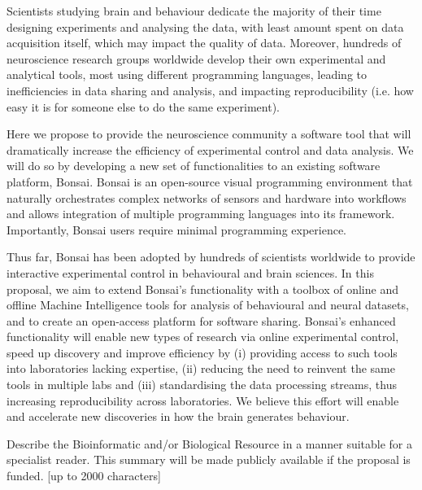Scientists studying brain and behaviour dedicate the majority of their time designing experiments and analysing the data, with least amount spent on data acquisition itself, which may impact the quality of data. Moreover, hundreds of neuroscience research groups worldwide develop their own experimental and analytical tools, most using different programming languages, leading to  inefficiencies in data sharing and analysis, and impacting reproducibility (i.e. how easy it is for someone else to do the same experiment). 

Here we propose to provide the neuroscience community a software tool that will dramatically increase the efficiency of experimental control and data analysis. We will do so by developing a new set of functionalities to an existing software platform, Bonsai. Bonsai is an open-source visual programming environment that naturally orchestrates complex networks of sensors and hardware into workflows and allows integration of multiple programming languages into its framework. Importantly, Bonsai users require minimal programming experience. 

Thus far, Bonsai has been adopted by hundreds of scientists worldwide to provide interactive experimental control in behavioural and brain sciences. In this proposal, we aim to extend Bonsai’s functionality with a toolbox of online and offline Machine Intelligence tools for analysis of behavioural and neural datasets, and to create an open-access platform for software sharing. Bonsai’s enhanced functionality will enable new types of research via online experimental control, speed up discovery and improve efficiency by (i) providing access to such tools into laboratories lacking expertise, (ii) reducing the need to reinvent the same tools in multiple labs and (iii) standardising the data processing streams, thus increasing reproducibility across laboratories. We believe this effort will enable and accelerate new discoveries in how the brain generates behaviour. 



Describe the Bioinformatic and/or Biological Resource in a manner suitable for a specialist reader. This summary will be made publicly available if the proposal is funded. [up to 2000 characters]

